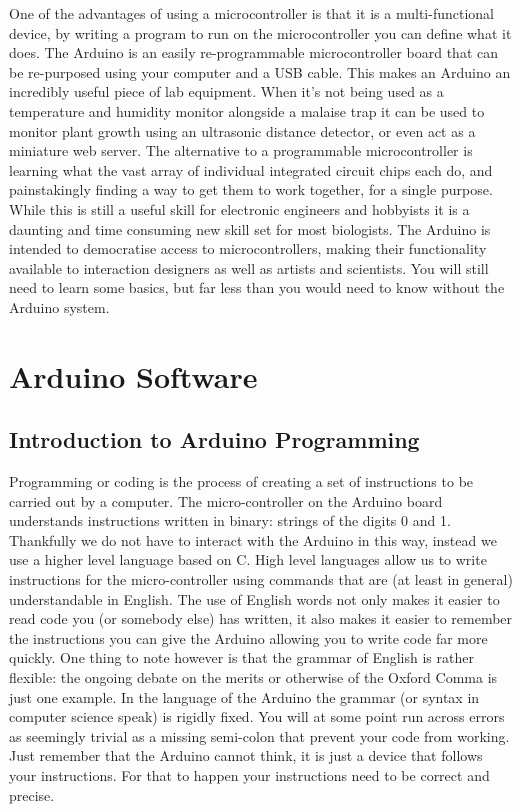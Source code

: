 \documentclass[
]{book}
\begin{document}
One of the advantages of using a microcontroller is that it is a multi-functional device, by writing a program to run on the microcontroller you can define what it does. The Arduino is an easily re-programmable microcontroller board that can be re-purposed using your computer and a USB cable. This makes an Arduino an incredibly useful piece of lab equipment. When it's not being used as a temperature and humidity monitor alongside a malaise trap it can be used to monitor plant growth using an ultrasonic distance detector, or even act as a miniature web server. The alternative to a programmable microcontroller is learning what the vast array of individual integrated circuit chips each do, and painstakingly finding a way to get them to work together, for a single purpose. While this is still a useful skill for electronic engineers and hobbyists it is a daunting and time consuming new skill set for most biologists. The Arduino is intended to democratise access to microcontrollers, making their functionality available to interaction designers as well as artists and scientists. You will still need to learn some basics, but far less than you would need to know without the Arduino system.

\chapter{Arduino Software}\label{arduino-software}

\section{Introduction to Arduino Programming}\label{introduction-to-arduino-programming}

Programming or coding is the process of creating a set of instructions to be carried out by a computer. The micro-controller on the Arduino board understands instructions written in binary: strings of the digits 0 and 1. Thankfully we do not have to interact with the Arduino in this way, instead we use a higher level language based on C. High level languages allow us to write instructions for the micro-controller using commands that are (at least in general) understandable in English. The use of English words not only makes it easier to read code you (or somebody else) has written, it also makes it easier to remember the instructions you can give the Arduino allowing you to write code far more quickly. One thing to note however is that the grammar of English is rather flexible: the ongoing debate on the merits or otherwise of the Oxford Comma is just one example. In the language of the Arduino the grammar (or syntax in computer science speak) is rigidly fixed. You will at some point run across errors as seemingly trivial as a missing semi-colon that prevent your code from working. Just remember that the Arduino cannot think, it is just a device that follows your instructions. For that to happen your instructions need to be correct and precise.
\end{document}

